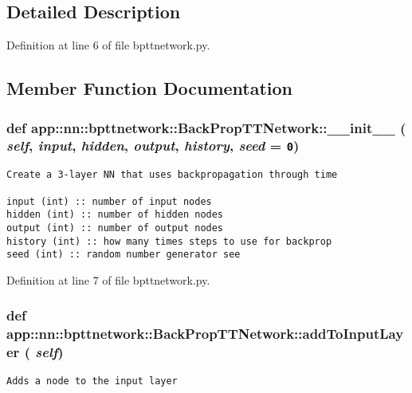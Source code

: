 \subsection{Detailed Description}


Definition at line 6 of file bpttnetwork.py.

\subsection{Member Function Documentation}
\subsubsection{\setlength{\rightskip}{0pt plus 5cm}def app::nn::bpttnetwork::BackPropTTNetwork::\_\-\_\-init\_\-\_\- ( {\em self},  {\em input},  {\em hidden},  {\em output},  {\em history},  {\em seed} = {\tt 0})}\label{classapp_1_1nn_1_1bpttnetwork_1_1BackPropTTNetwork_e88d621dd335d810bc064d463492f63c}




\footnotesize\begin{verbatim}Create a 3-layer NN that uses backpropagation through time

input (int) :: number of input nodes
hidden (int) :: number of hidden nodes
output (int) :: number of output nodes
history (int) :: how many times steps to use for backprop
seed (int) :: random number generator see
\end{verbatim}
\normalsize
 

Definition at line 7 of file bpttnetwork.py.
\subsubsection{\setlength{\rightskip}{0pt plus 5cm}def app::nn::bpttnetwork::BackPropTTNetwork::addToInputLayer ( {\em self})}\label{classapp_1_1nn_1_1bpttnetwork_1_1BackPropTTNetwork_a2f82f0b24da54b39bec328e52330cd6}




\footnotesize\begin{verbatim}Adds a node to the input layer\end{verbatim}
\normalsize
 

